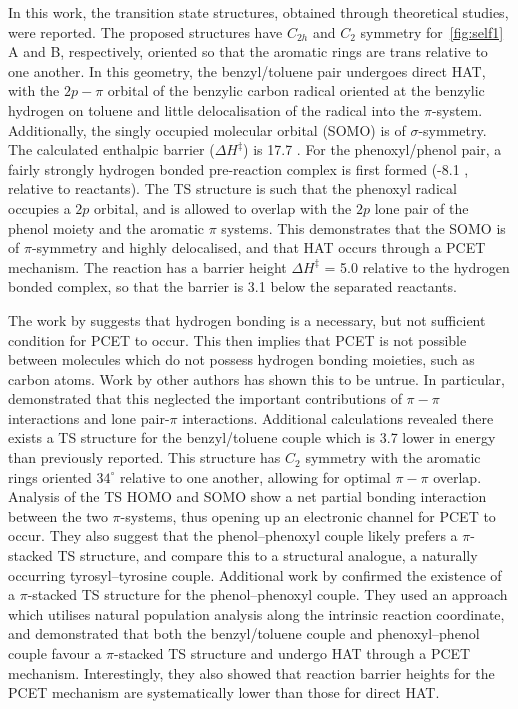 In this work, the transition state structures, obtained through theoretical studies, were reported. The proposed structures have $C_{2h}$ and $C_2$ symmetry for~\ref{fig:self1} A and B, respectively, oriented so that the aromatic rings are trans relative to one another. In this geometry, the benzyl/toluene pair undergoes direct HAT, with the $2p-\pi$ orbital of the benzylic carbon radical oriented at the benzylic hydrogen on toluene and little delocalisation of the radical into the $\pi$-system. Additionally, the singly occupied molecular orbital (SOMO) is of $\sigma$-symmetry. The calculated enthalpic barrier ($\Delta H^{\ddagger}$) is 17.7 \kcalmol. For the phenoxyl/phenol pair, a fairly strongly hydrogen bonded pre-reaction complex is first formed (-8.1 \kcalmol, relative to reactants).
The TS structure is such that the phenoxyl radical occupies a $2p$ orbital, and is allowed to overlap with the $2p$ lone pair of the phenol moiety and the aromatic $\pi$ systems. This demonstrates that the SOMO is of $\pi$-symmetry and highly delocalised, and that HAT occurs through a PCET mechanism. The reaction has a barrier height $\Delta H^{\ddagger}$ = 5.0 \kcalmol relative to the hydrogen bonded complex, so that the barrier is 3.1 \kcalmol below the separated reactants.

The work by \citet{Mayer2002} suggests that hydrogen bonding is a necessary, but not sufficient condition for PCET to occur. This then implies that PCET is not possible between molecules which do not possess hydrogen bonding moieties, such as carbon atoms. Work by other authors has shown this to be untrue.\cite{Hatcher2007, DiLabio2007} In particular, \citet{DiLabio2007} demonstrated that this neglected the important contributions of $\pi-\pi$ interactions and lone pair-$\pi$ interactions. Additional calculations revealed there exists a TS structure for the benzyl/toluene couple which is 3.7 \kcalmol lower in energy than previously reported. This structure has $C_2$ symmetry with the aromatic rings oriented $34^\circ$ relative to one another, allowing for optimal $\pi-\pi$ overlap.
Analysis of the TS HOMO and SOMO show a net partial bonding interaction between the two $\pi$-systems, thus opening up an electronic channel for PCET to occur. They also suggest that the phenol--phenoxyl couple likely prefers a $\pi$-stacked TS structure, and compare this to a structural analogue, a naturally occurring tyrosyl--tyrosine couple. Additional work by \citet{MunozRugeles2017} confirmed the existence of a $\pi$-stacked TS structure for the phenol--phenoxyl couple. They used an approach which utilises natural population analysis along the intrinsic reaction coordinate, and demonstrated that both the benzyl/toluene couple and phenoxyl--phenol couple favour a $\pi$-stacked TS structure and undergo HAT through a PCET mechanism. Interestingly, they also showed that reaction barrier heights for the PCET mechanism are systematically lower than those for direct HAT.

